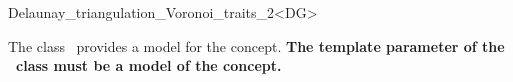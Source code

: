 

\begin{ccRefClass}{Delaunay_triangulation_Voronoi_traits_2<DG>}


\ccDefinition

The class \ccRefName\ provides a model for the 
concept. {\bf The template parameter of the \ccRefName\ class must be a
model of the  concept.}



\ccIsModel
{}

\ccSeeAlso
{}\\
\\
\end{ccRefClass}


